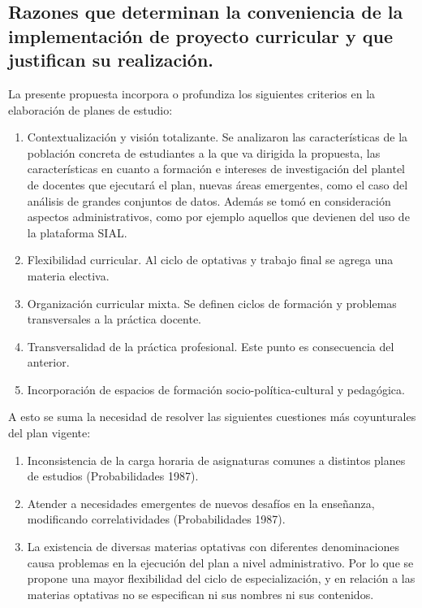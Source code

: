 \documentclass[a4paper, 12pt]{article}
\begin{document}
\subsection{Razones que determinan la conveniencia de la implementación de proyecto curricular  y que justifican su realización.}

La presente propuesta incorpora o profundiza los siguientes criterios en la elaboración de planes de estudio: 

\begin{enumerate}
\item  Contextualización y visión totalizante. Se analizaron las características de la población concreta de estudiantes a la que va dirigida la propuesta, las características en cuanto a formación e intereses de investigación del plantel de docentes que ejecutará el plan, nuevas áreas emergentes, como el caso del análisis de grandes conjuntos de datos. Además se tomó en consideración aspectos administrativos, como por ejemplo aquellos que devienen del uso de la plataforma SIAL. 
\item Flexibilidad curricular. Al ciclo de optativas y trabajo final se agrega una materia electiva.
\item Organización curricular mixta. Se definen ciclos de formación y problemas transversales a la práctica docente. 
\item Transversalidad de la práctica profesional. Este punto es consecuencia del anterior.
\item Incorporación de espacios de formación socio-política-cultural y pedagógica.
\end{enumerate}

A esto se suma la necesidad de resolver las siguientes cuestiones más coyunturales del plan vigente:

\begin{enumerate}
\item Inconsistencia de la carga horaria de asignaturas  comunes a distintos planes de estudios (Probabilidades 1987).

\item Atender a necesidades emergentes de nuevos desafíos en la enseñanza, modificando correlatividades (Probabilidades 1987). 

\item La existencia de diversas materias optativas con diferentes denominaciones causa problemas en la ejecución del plan a nivel administrativo. Por lo que se propone una mayor flexibilidad del ciclo de especialización, y en relación a las materias optativas no se especifican ni sus nombres ni sus contenidos. 
\end{enumerate}
\end{document}
